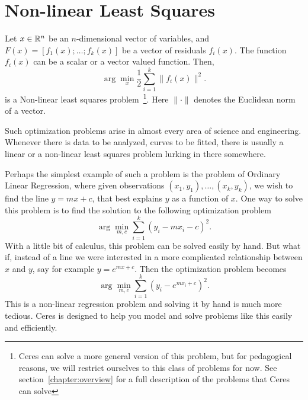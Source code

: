 \chapter{Non-linear Least Squares}
\label{chapter:tutorial:nonlinsq}
Let $x \in \mathbb{R}^n$ be an $n$-dimensional vector of variables, and
$F(x) = \left[f_1(x); \hdots ; f_k(x)\right]$ be a vector of residuals $f_i(x)$. 
The function $f_i(x)$ can be a scalar or a vector valued
function.  Then, 
\begin{equation}
	\arg \min_x \frac{1}{2} \sum_{i=1}^k \|f_i(x)\|^2.
\end{equation}
is a Non-linear least squares problem~\footnote{Ceres can solve a more general version of this problem, but for pedagogical reasons, we will restrict ourselves to this class of problems for now. See section~\ref{chapter:overview} for a full description of the problems that Ceres can solve}. Here $\|\cdot\|$ denotes the Euclidean norm of a vector. 

Such optimization problems arise in almost every area of science and engineering. Whenever there is data to be analyzed, curves to be fitted, there is usually a linear or a non-linear least squares problem lurking in there somewhere. 

Perhaps the simplest example of such a problem is the problem of Ordinary Linear Regression, where given observations $(x_1,y_1),\hdots, (x_k,y_k)$, we wish to find the line $y = mx + c$, that best explains $y$ as a function of $x$. One way to solve this problem is to find the solution to the following optimization problem
\begin{equation}
		\arg\min_{m,c} \sum_{i=1}^k (y_i - m x_i - c)^2.
\end{equation}
With a little bit of calculus, this problem can be solved easily by hand. But what if, instead of a line we were interested in a more complicated relationship between $x$ and $y$, say for example $y = e^{mx + c}$. Then the optimization problem becomes
\begin{equation}
		\arg\min_{m,c} \sum_{i=1}^k \left(y_i - e^{m x_i + c}\right)^2.
\end{equation}
This is a  non-linear regression problem and solving it by hand is much more tedious.  Ceres is designed to help you model and solve problems like this easily and efficiently.